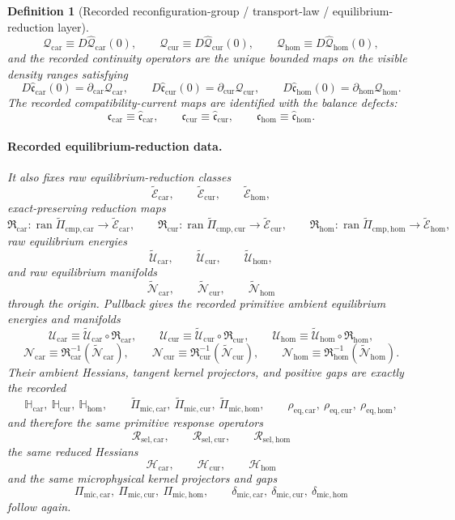 \documentclass[11pt]{article}
\newcommand{\UltraCarProj}{\Pi_{\mathrm{mic,car}}}
\newcommand{\UltraCurProj}{\Pi_{\mathrm{mic,cur}}}
\newcommand{\UltraHomProj}{\Pi_{\mathrm{mic,hom}}}
\newcommand{\UltraCarGap}{\delta_{\mathrm{mic,car}}}
\newcommand{\UltraCurGap}{\delta_{\mathrm{mic,cur}}}
\newcommand{\UltraHomGap}{\delta_{\mathrm{mic,hom}}}
\newcommand{\TensorHess}{\mathcal H_{\mathrm{car}}}
\newcommand{\CurHess}{\mathcal H_{\mathrm{cur}}}
\newcommand{\HomHess}{\mathcal H_{\mathrm{hom}}}
\newcommand{\TensorCurrent}{\mathfrak c_{\mathrm{car}}}
\newcommand{\CurCurrent}{\mathfrak c_{\mathrm{cur}}}
\newcommand{\HomCurrent}{\mathfrak c_{\mathrm{hom}}}
\newcommand{\TensorResp}{\mathcal R_{\mathrm{sel,car}}}
\newcommand{\CurResp}{\mathcal R_{\mathrm{sel,cur}}}
\newcommand{\HomResp}{\mathcal R_{\mathrm{sel,hom}}}
\newcommand{\TensorDensity}{\mathcal Q_{\mathrm{car}}}
\newcommand{\CurDensity}{\mathcal Q_{\mathrm{cur}}}
\newcommand{\HomDensity}{\mathcal Q_{\mathrm{hom}}}
\newcommand{\TensorCont}{\partial_{\mathrm{car}}}
\newcommand{\CurCont}{\partial_{\mathrm{cur}}}
\newcommand{\HomCont}{\partial_{\mathrm{hom}}}
\newcommand{\TensorAmbientHess}{\mathbb H_{\mathrm{car}}}
\newcommand{\CurAmbientHess}{\mathbb H_{\mathrm{cur}}}
\newcommand{\HomAmbientHess}{\mathbb H_{\mathrm{hom}}}
\newcommand{\TensorEqCmpProj}{\widetilde\Pi_{\mathrm{cmp,car}}}
\newcommand{\CurEqCmpProj}{\widetilde\Pi_{\mathrm{cmp,cur}}}
\newcommand{\HomEqCmpProj}{\widetilde\Pi_{\mathrm{cmp,hom}}}
\newcommand{\TensorEqKerProj}{\widetilde\Pi_{\mathrm{mic,car}}}
\newcommand{\CurEqKerProj}{\widetilde\Pi_{\mathrm{mic,cur}}}
\newcommand{\HomEqKerProj}{\widetilde\Pi_{\mathrm{mic,hom}}}
\newcommand{\EqCarGap}{\rho_{\mathrm{eq,car}}}
\newcommand{\EqCurGap}{\rho_{\mathrm{eq,cur}}}
\newcommand{\EqHomGap}{\rho_{\mathrm{eq,hom}}}
\newcommand{\TensorPrimitiveDensity}{\widehat{\mathcal Q}_{\mathrm{car}}}
\newcommand{\CurPrimitiveDensity}{\widehat{\mathcal Q}_{\mathrm{cur}}}
\newcommand{\HomPrimitiveDensity}{\widehat{\mathcal Q}_{\mathrm{hom}}}
\newcommand{\TensorBalance}{\widehat{\mathfrak c}_{\mathrm{car}}}
\newcommand{\CurBalance}{\widehat{\mathfrak c}_{\mathrm{cur}}}
\newcommand{\HomBalance}{\widehat{\mathfrak c}_{\mathrm{hom}}}
\newcommand{\TensorAmbientEnergy}{\mathcal U_{\mathrm{car}}}
\newcommand{\CurAmbientEnergy}{\mathcal U_{\mathrm{cur}}}
\newcommand{\HomAmbientEnergy}{\mathcal U_{\mathrm{hom}}}
\newcommand{\TensorEqManifold}{\mathcal N_{\mathrm{car}}}
\newcommand{\CurEqManifold}{\mathcal N_{\mathrm{cur}}}
\newcommand{\HomEqManifold}{\mathcal N_{\mathrm{hom}}}
\newcommand{\TensorRawEqClass}{\widetilde{\mathscr E}_{\mathrm{car}}}
\newcommand{\CurRawEqClass}{\widetilde{\mathscr E}_{\mathrm{cur}}}
\newcommand{\HomRawEqClass}{\widetilde{\mathscr E}_{\mathrm{hom}}}
\newcommand{\TensorEqReduce}{\mathfrak R_{\mathrm{car}}}
\newcommand{\CurEqReduce}{\mathfrak R_{\mathrm{cur}}}
\newcommand{\HomEqReduce}{\mathfrak R_{\mathrm{hom}}}
\newcommand{\TensorRawEnergy}{\widetilde{\mathcal U}_{\mathrm{car}}}
\newcommand{\CurRawEnergy}{\widetilde{\mathcal U}_{\mathrm{cur}}}
\newcommand{\HomRawEnergy}{\widetilde{\mathcal U}_{\mathrm{hom}}}
\newcommand{\TensorRawEqManifold}{\widetilde{\mathcal N}_{\mathrm{car}}}
\newcommand{\CurRawEqManifold}{\widetilde{\mathcal N}_{\mathrm{cur}}}
\newcommand{\HomRawEqManifold}{\widetilde{\mathcal N}_{\mathrm{hom}}}
\newtheorem{definition}{Definition}
\begin{document}
\begin{definition}[Recorded reconfiguration-group / transport-law / equilibrium-reduction layer]
\begin{equation}
\TensorDensity\equiv D\TensorPrimitiveDensity(0),\qquad
\CurDensity\equiv D\CurPrimitiveDensity(0),\qquad
\HomDensity\equiv D\HomPrimitiveDensity(0),
\label{eq:recorded_density_maps}
\end{equation}
and the recorded continuity operators are the unique bounded maps on the visible density ranges satisfying
\begin{equation}
D\TensorBalance(0)=\TensorCont\TensorDensity,\qquad
D\CurBalance(0)=\CurCont\CurDensity,\qquad
D\HomBalance(0)=\HomCont\HomDensity.
\label{eq:recorded_cont_factor}
\end{equation}
The recorded compatibility-current maps are identified with the balance defects:
\begin{equation}
\TensorCurrent\equiv\TensorBalance,\qquad
\CurCurrent\equiv\CurBalance,\qquad
\HomCurrent\equiv\HomBalance.
\label{eq:recorded_currents}
\end{equation}

\paragraph{Recorded equilibrium-reduction data.}
It also fixes raw equilibrium-reduction classes
\[
\TensorRawEqClass,\qquad
\CurRawEqClass,\qquad
\HomRawEqClass,
\]
exact-preserving reduction maps
\[
\TensorEqReduce:\operatorname{ran}\TensorEqCmpProj\to\TensorRawEqClass,\qquad
\CurEqReduce:\operatorname{ran}\CurEqCmpProj\to\CurRawEqClass,\qquad
\HomEqReduce:\operatorname{ran}\HomEqCmpProj\to\HomRawEqClass,
\]
raw equilibrium energies
\[
\TensorRawEnergy,\qquad
\CurRawEnergy,\qquad
\HomRawEnergy,
\]
and raw equilibrium manifolds
\[
\TensorRawEqManifold,\qquad
\CurRawEqManifold,\qquad
\HomRawEqManifold
\]
through the origin. Pullback gives the recorded primitive ambient equilibrium energies and manifolds
\begin{equation}
\TensorAmbientEnergy\equiv\TensorRawEnergy\circ\TensorEqReduce,\qquad
\CurAmbientEnergy\equiv\CurRawEnergy\circ\CurEqReduce,\qquad
\HomAmbientEnergy\equiv\HomRawEnergy\circ\HomEqReduce,
\label{eq:recorded_ambient_energy}
\end{equation}
\begin{equation}
\TensorEqManifold\equiv\TensorEqReduce^{-1}(\TensorRawEqManifold),\qquad
\CurEqManifold\equiv\CurEqReduce^{-1}(\CurRawEqManifold),\qquad
\HomEqManifold\equiv\HomEqReduce^{-1}(\HomRawEqManifold).
\label{eq:recorded_eq_manifolds}
\end{equation}
Their ambient Hessians, tangent kernel projectors, and positive gaps are exactly the recorded
\[
\TensorAmbientHess,\ \CurAmbientHess,\ \HomAmbientHess,\qquad
\TensorEqKerProj,\ \CurEqKerProj,\ \HomEqKerProj,\qquad
\EqCarGap,\ \EqCurGap,\ \EqHomGap,
\]
and therefore the same primitive response operators
\[
\TensorResp,\qquad
\CurResp,\qquad
\HomResp
\]
the same reduced Hessians
\[
\TensorHess,\qquad
\CurHess,\qquad
\HomHess
\]
and the same microphysical kernel projectors and gaps
\[
\UltraCarProj,\ \UltraCurProj,\ \UltraHomProj,\qquad
\UltraCarGap,\ \UltraCurGap,\ \UltraHomGap
\]
follow again.
\end{definition}
\end{document}
